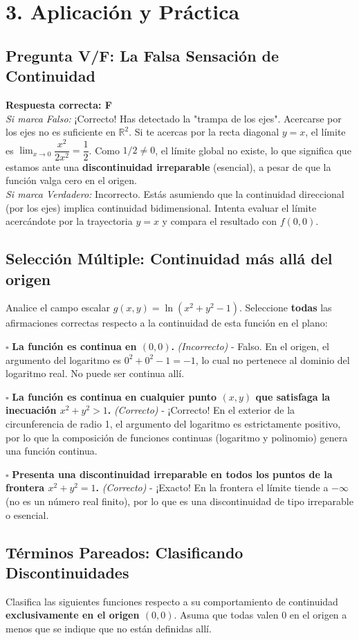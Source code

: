 \documentclass[11pt]{article}
\newenvironment{aplicacion}{%
  \section*{3. Aplicación y Práctica}%
}{}
\newenvironment{preguntaverdaderofalso}[1]{\subsection*{Pregunta V/F: #1}\par\vspace{0.1cm}}{\vspace{0.3cm}}
\newcommand{\verdaderofalso}[3]{\par\noindent\textbf{Respuesta correcta: #1} \\ \textit{Si marca Falso:} #2 \\ \textit{Si marca Verdadero:} #3\par\vspace{0.15cm}}
\newenvironment{preguntacasillas}[1]{\subsection*{Selección Múltiple: #1}\par\vspace{0.1cm}}{\vspace{0.3cm}}
\newcommand{\casilla}[3]{\par\noindent $\square$ \textbf{#1} \textit{(#2)} - #3\par\vspace{0.15cm}}
\newenvironment{pareados}[1]{\subsection*{Términos Pareados: #1}}{\vspace{0.3cm}}
\begin{document}
\begin{aplicacion}
\begin{preguntaverdaderofalso}{La Falsa Sensación de Continuidad}
    \verdaderofalso{F}
      {¡Correcto! Has detectado la "trampa de los ejes". Acercarse por los ejes no es suficiente en $\mathbb{R}^2$. Si te acercas por la recta diagonal $y = x$, el límite es $\displaystyle \lim_{x\to 0}\dfrac{x^2}{2x^2} = \dfrac{1}{2}$. Como $1/2 \neq 0$, el límite global no existe, lo que significa que estamos ante una \textbf{discontinuidad irreparable} (esencial), a pesar de que la función valga cero en el origen.}
      {Incorrecto. Estás asumiendo que la continuidad direccional (por los ejes) implica continuidad bidimensional. Intenta evaluar el límite acercándote por la trayectoria $y = x$ y compara el resultado con $f(0,0)$.}
  \end{preguntaverdaderofalso}

  \begin{preguntacasillas}{Continuidad más allá del origen}
    Analice el campo escalar $g(x,y) = \ln(x^2 + y^2 - 1)$. Seleccione \textbf{todas} las afirmaciones correctas respecto a la continuidad de esta función en el plano:
    
    \casilla{La función es continua en $(0,0)$.}{Incorrecto}{Falso. En el origen, el argumento del logaritmo es $0^2+0^2-1 = -1$, lo cual no pertenece al dominio del logaritmo real. No puede ser continua allí.}
    \casilla{La función es continua en cualquier punto $(x,y)$ que satisfaga la inecuación $x^2 + y^2 > 1$.}{Correcto}{¡Correcto! En el exterior de la circunferencia de radio 1, el argumento del logaritmo es estrictamente positivo, por lo que la composición de funciones continuas (logaritmo y polinomio) genera una función continua.}
    \casilla{Presenta una discontinuidad irreparable en todos los puntos de la frontera $x^2 + y^2 = 1$.}{Correcto}{¡Exacto! En la frontera el límite tiende a $-\infty$ (no es un número real finito), por lo que es una discontinuidad de tipo irreparable o esencial.}
  \end{preguntacasillas}

  \begin{pareados}{Clasificando Discontinuidades}
    Clasifica las siguientes funciones respecto a su comportamiento de continuidad \textbf{exclusivamente en el origen $(0,0)$}. Asuma que todas valen $0$ en el origen a menos que se indique que no están definidas allí.
    

\end{pareados}
\end{aplicacion}
\end{document}
